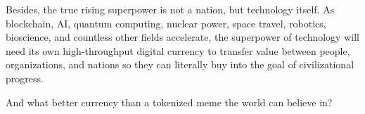 \documentclass{article}
\begin{document}
Besides, the true rising superpower is not a nation, but technology itself. As blockchain, AI, quantum computing, nuclear power, space travel, robotics, bioscience, and countless other fields accelerate, the superpower of technology will need its own high-throughput digital currency to transfer value between people, organizations, and nations so they can literally buy into the goal of civilizational progress.

And what better currency than a tokenized meme the world can believe in?
\end{document}

